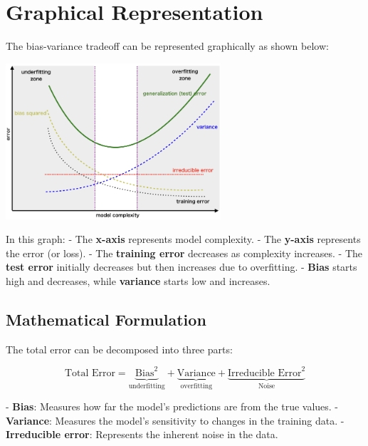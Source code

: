 \documentclass{article}
\begin{document}
\section*{Graphical Representation}

The bias-variance tradeoff can be represented graphically as shown below:

\begin{center}
    \includegraphics[width=0.6\textwidth]{bias-variance.png}
\end{center}

In this graph:
- The \textbf{x-axis} represents model complexity.
- The \textbf{y-axis} represents the error (or loss).
- The \textbf{training error} decreases as complexity increases.
- The \textbf{test error} initially decreases but then increases due to overfitting.
- \textbf{Bias} starts high and decreases, while \textbf{variance} starts low and increases.

\subsection*{Mathematical Formulation}

The total error can be decomposed into three parts:

\[
\text{Total Error} = \underbrace{\text{Bias}^2}_{\text{underfitting}} + \underbrace{\text{Variance}}_{\text{overfitting}} + \underbrace{\text{Irreducible Error}^2}_{\text{Noise}}
\]

- \textbf{Bias}: Measures how far the model's predictions are from the true values.
- \textbf{Variance}: Measures the model's sensitivity to changes in the training data.
- \textbf{Irreducible error}: Represents the inherent noise in the data.


\end{document}
